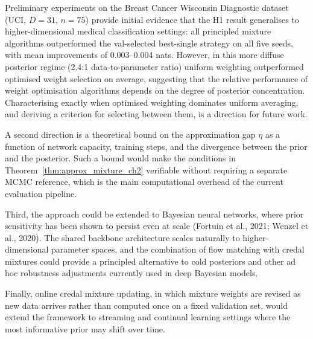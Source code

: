 Preliminary experiments on the Breast 
Cancer Wisconsin Diagnostic dataset 
(UCI, $D = 31$, $n = 75$) provide 
initial evidence that the H1 result 
generalises to higher-dimensional 
medical classification settings: all 
principled mixture algorithms 
outperformed the val-selected 
best-single strategy on all five 
seeds, with mean improvements of 
0.003--0.004 nats. However, in this 
more diffuse posterior regime 
(2.4:1 data-to-parameter ratio) 
uniform weighting outperformed 
optimised weight selection on 
average, suggesting that the 
relative performance of weight 
optimisation algorithms depends on 
the degree of posterior 
concentration. Characterising 
exactly when optimised weighting 
dominates uniform averaging, and 
deriving a criterion for selecting 
between them, is a direction for 
future work.

A second direction is a theoretical 
bound on the approximation gap $\eta$ 
as a function of network capacity, 
training steps, and the divergence 
between the prior and the posterior. 
Such a bound would make the conditions 
in Theorem~\ref{thm:approx_mixture_ch2} 
verifiable without requiring a separate 
MCMC reference, which is the main 
computational overhead of the current 
evaluation pipeline.

Third, the approach could be extended 
to Bayesian neural networks, where 
prior sensitivity has been shown to 
persist even at scale (Fortuin et 
al., 2021; Wenzel et al., 2020). The 
shared backbone architecture scales 
naturally to higher-dimensional 
parameter spaces, and the combination 
of flow matching with credal mixtures 
could provide a principled alternative 
to cold posteriors and other ad hoc 
robustness adjustments currently 
used in deep Bayesian models.

Finally, online credal mixture 
updating, in which mixture weights 
are revised as new data arrives 
rather than computed once on a 
fixed validation set, would extend 
the framework to streaming and 
continual learning settings where 
the most informative prior may 
shift over time.